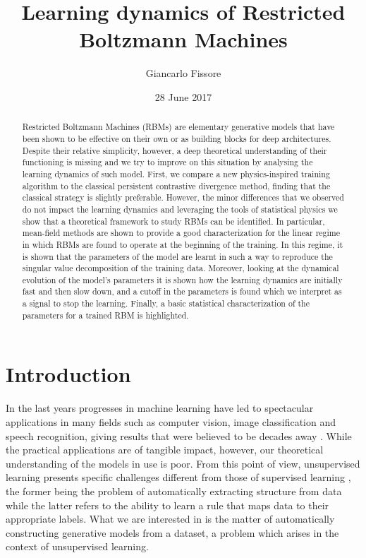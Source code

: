 \documentclass[notitlepage]{revtex4-1}
\begin{document}
\title{Learning dynamics of Restricted Boltzmann Machines}

\author{Giancarlo Fissore}

\date{28 June 2017}

\begin{abstract}
Restricted Boltzmann Machines (RBMs) are elementary generative models that have been shown to be effective on their own or as building blocks for deep architectures. Despite their relative simplicity, however, a deep theoretical understanding of their functioning is missing and we try to improve on this situation by analysing the learning dynamics of such model. First, we compare a new physics-inspired training algorithm to the classical persistent contrastive divergence method, finding that the classical strategy is slightly preferable. However, the minor differences that we observed do not impact the learning dynamics and leveraging the tools of statistical physics we show that a theoretical framework to study RBMs can be identified. In particular, mean-field methods are shown to provide a good characterization for the linear regime in which RBMs are found to operate at the beginning of the training. In this regime, it is shown that the parameters of the model are learnt in such a way to reproduce the singular value decomposition of the training data. Moreover, looking at the dynamical evolution of the model's parameters it is shown how the learning dynamics are initially fast and then slow down, and a cutoff in the parameters is found which we interpret as a signal to stop the learning. Finally, a basic statistical characterization of the parameters for a trained RBM is highlighted.
\end{abstract}

\maketitle

\section*{Introduction}
In the last years progresses in machine learning have led to spectacular applications in many fields such as computer vision, image classification and speech recognition, giving results that were believed to be decades away \cite{go}. While the practical applications are of tangible impact, however, our theoretical understanding of the models in use is poor. From this point of view, unsupervised learning presents specific challenges different from those of supervised learning \cite{foundations}, the former being the problem of automatically extracting structure from data while the latter refers to the ability to learn a rule that maps data to their appropriate labels. What we are interested in is the matter of automatically constructing generative models from a dataset, a problem which arises in the context of unsupervised learning.
\end{document}
